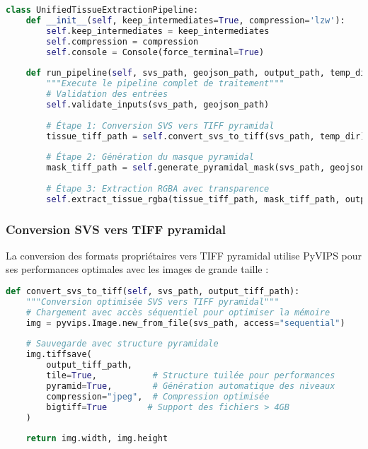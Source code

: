 \documentclass[12pt,a4paper]{report}
\begin{document}
\begin{lstlisting}[language=Python, caption=Structure principale du pipeline unifié]
class UnifiedTissueExtractionPipeline:
    def __init__(self, keep_intermediates=True, compression='lzw'):
        self.keep_intermediates = keep_intermediates
        self.compression = compression
        self.console = Console(force_terminal=True)
    
    def run_pipeline(self, svs_path, geojson_path, output_path, temp_dir=None):
        """Execute le pipeline complet de traitement"""
        # Validation des entrées
        self.validate_inputs(svs_path, geojson_path)
        
        # Étape 1: Conversion SVS vers TIFF pyramidal
        tissue_tiff_path = self.convert_svs_to_tiff(svs_path, temp_dir)
        
        # Étape 2: Génération du masque pyramidal
        mask_tiff_path = self.generate_pyramidal_mask(svs_path, geojson_path, temp_dir)
        
        # Étape 3: Extraction RGBA avec transparence
        self.extract_tissue_rgba(tissue_tiff_path, mask_tiff_path, output_path)
\end{lstlisting}

\subsubsection{Conversion SVS vers TIFF pyramidal}

La conversion des formats propriétaires vers TIFF pyramidal utilise PyVIPS pour ses performances optimales avec les images de grande taille :

\begin{lstlisting}[language=Python, caption=Conversion SVS optimisée]
def convert_svs_to_tiff(self, svs_path, output_tiff_path):
    """Conversion optimisée SVS vers TIFF pyramidal"""
    # Chargement avec accès séquentiel pour optimiser la mémoire
    img = pyvips.Image.new_from_file(svs_path, access="sequential")
    
    # Sauvegarde avec structure pyramidale
    img.tiffsave(
        output_tiff_path,
        tile=True,           # Structure tuilée pour performances
        pyramid=True,        # Génération automatique des niveaux
        compression="jpeg",  # Compression optimisée
        bigtiff=True        # Support des fichiers > 4GB
    )
    
    return img.width, img.height
\end{lstlisting}
\end{document}
